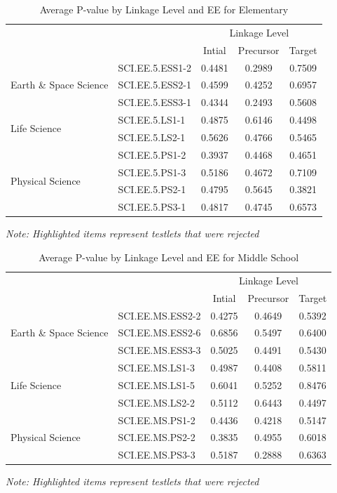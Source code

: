 \documentclass[11.5pt]{sig-alternate} %
\begin{document}
\begin{large}
\begin{table}[thp]
\caption{Average P-value by Linkage Level and EE for Elementary}
\begin{tabular}{llccc}
\hline
& & \multicolumn{3}{c}{Linkage Level} \\ \cline{3-5}
& & Intial & Precursor & Target \\ \hline
\multirow{3}{*}{Earth \& Space Science} & SCI.EE.5.ESS1-2 & 0.4481 & \cellcolor{yellow}0.2989 & 0.7509 \\
& SCI.EE.5.ESS2-1 & 0.4599 & 0.4252 & 0.6957 \\
& SCI.EE.5.ESS3-1 & 0.4344 & \cellcolor{yellow}0.2493 & 0.5608 \\ \hline
\multirow{2}{*}{Life Science} & SCI.EE.5.LS1-1 & 0.4875 & 0.6146 & 0.4498 \\
& SCI.EE.5.LS2-1 & 0.5626 & 0.4766 & 0.5465 \\ \hline
\multirow{4}{*}{Physical Science} & SCI.EE.5.PS1-2 & 0.3937 & 0.4468 & 0.4651 \\
& SCI.EE.5.PS1-3 & 0.5186 & 0.4672 & 0.7109 \\
& SCI.EE.5.PS2-1 & 0.4795 & 0.5645 & 0.3821 \\
& SCI.EE.5.PS3-1 & 0.4817 & 0.4745 & 0.6573 \\ \hline
\end{tabular}
\textit{Note: Highlighted items represent testlets that were rejected}
\end{table}

\begin{table}[thp]
\caption{Average P-value by Linkage Level and EE for Middle School}
\begin{tabular}{llccc}
\hline
& & \multicolumn{3}{c}{Linkage Level} \\ \cline{3-5}
& & Intial & Precursor & Target \\ \hline
\multirow{3}{*}{Earth \& Space Science} & SCI.EE.MS.ESS2-2 & 0.4275 & 0.4649 & 0.5392 \\
 & SCI.EE.MS.ESS2-6 & 0.6856 & 0.5497 & 0.6400 \\
 & SCI.EE.MS.ESS3-3 & 0.5025 & 0.4491 & 0.5430 \\ \hline
\multirow{3}{*}{Life Science} & SCI.EE.MS.LS1-3 & 0.4987 & 0.4408 & 0.5811 \\
 & SCI.EE.MS.LS1-5 & 0.6041 & 0.5252 & 0.8476 \\
 & SCI.EE.MS.LS2-2 & 0.5112 & 0.6443 & 0.4497 \\ \hline
\multirow{3}{*}{Physical Science} & SCI.EE.MS.PS1-2 & 0.4436 & 0.4218 & 0.5147 \\
 & SCI.EE.MS.PS2-2 & \cellcolor{yellow}0.3835 & 0.4955 & 0.6018 \\
 & SCI.EE.MS.PS3-3 & 0.5187 & \cellcolor{yellow}0.2888 & 0.6363 \\ \hline
\end{tabular}
\textit{Note: Highlighted items represent testlets that were rejected}
\end{table}


\end{large}
\end{document}
